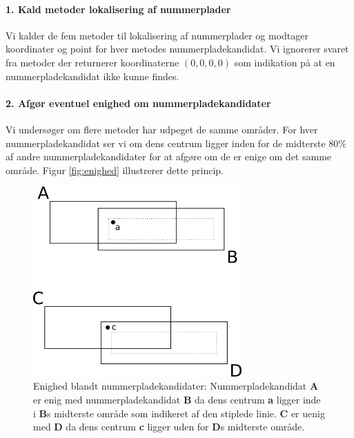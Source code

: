 \paragraph{1. Kald metoder lokalisering af nummerplader}
Vi kalder de fem metoder til lokalisering af nummerplader og modtager koordinater og point for hver metodes nummerpladekandidat. Vi ignorerer svaret fra metoder der returnerer koordinaterne $(0,0,0,0)$ som indikation på at en nummerpladekandidat ikke kunne findes.

\paragraph{2. Afgør eventuel enighed om nummerpladekandidater}
Vi undersøger om flere metoder har udpeget de samme områder. For hver nummerpladekandidat ser vi om dens centrum ligger inden for de midterste 80\% af andre nummerpladekandidater for at afgøre om de er enige om det samme område. Figur \vref{fig:enighed} illustrerer dette princip.

\begin{figure}[htp]
\centering
\includegraphics[width=8cm]{implementation/illu/illu_enighed.png}
\caption{Enighed blandt nummerpladekandidater: Nummerpladekandidat \textbf{A} er enig med nummerpladekandidat \textbf{B} da dens centrum \textbf{a} ligger inde i \textbf{B}s midterste område som indikeret af den stiplede linie. \textbf{C} er uenig med \textbf{D} da dens centrum \textbf{c} ligger uden for \textbf{D}s midterste område.}
\label{fig:enighed}
\end{figure}

